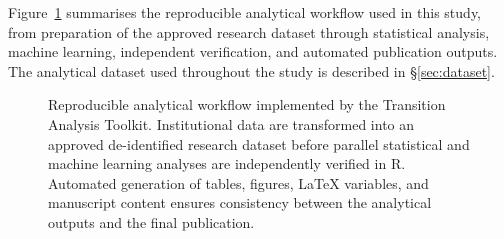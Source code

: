 Figure~\ref{fig:workflow} summarises the reproducible analytical workflow used in this study, from preparation of the approved research dataset through 
statistical analysis, machine learning, independent verification, and automated publication outputs. The analytical dataset used throughout the study is 
described in \S\ref{sec:dataset}.

\begin{figure}[htbp]
\centering


\caption{Reproducible analytical workflow implemented by the Transition Analysis Toolkit. Institutional data are transformed into an approved 
de-identified research dataset before parallel statistical and machine learning analyses are independently verified in R. Automated generation 
of tables, figures, LaTeX variables, and manuscript content ensures consistency between the analytical outputs and the final publication.}

\label{fig:workflow}

\end{figure}
